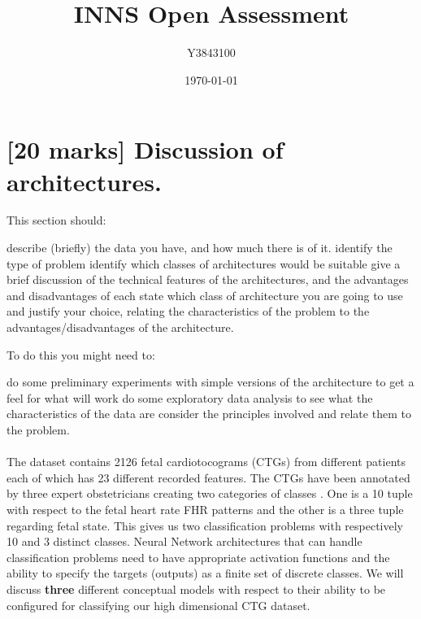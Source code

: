 \documentclass[11pt,a4paper]{article}
\title{INNS Open Assessment}
\author{Y3843100}
\date{\today}
\begin{document}


\maketitle


\section{[20 marks] Discussion of architectures.}

This section should:
\begin{outline}
  \1 describe (briefly) the data you have, and how much there is of it.
  \1 identify the type of problem
  \1 identify which classes of architectures would be suitable
  \1 give a brief discussion of the technical features of the architectures, and the advantages and disadvantages of each
  \1 state which class of architecture you are going to use and justify your choice, relating the characteristics of the problem to the advantages/disadvantages of the architecture.
\end{outline}

To do this you might need to:
\begin{outline}
  \1 do some preliminary experiments with simple versions of the architecture to get a feel for what will work
  \1 do some exploratory data analysis to see what the characteristics of the data are
  \1 consider the principles involved and relate them to the problem.
\end{outline}

\paragraph{}
The dataset contains 2126 fetal cardiotocograms (CTGs) from different patients each of which has 23 different recorded features. The CTGs have been annotated by three expert obstetricians creating two categories of classes \autocite{Campos:2000}. One is a 10 tuple with respect to the fetal heart rate FHR patterns and the other is a three tuple regarding fetal state. This gives us two classification problems with respectively 10 and 3 distinct classes. Neural Network architectures that can handle classification problems need to have appropriate activation functions and the ability to specify the targets (outputs) as a finite set of discrete classes. We will discuss \textbf{three} different conceptual models with respect to their ability to be configured for classifying our high dimensional CTG dataset.
\end{document}
